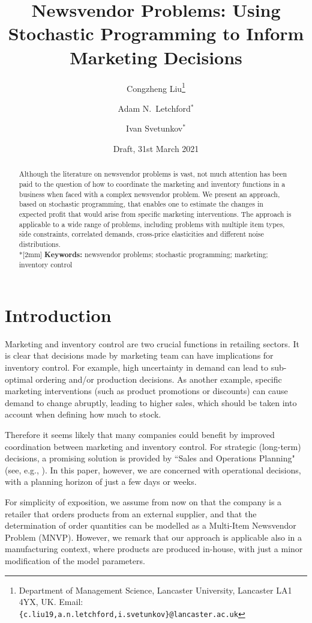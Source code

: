 \documentclass[a4paper,11pt]{article}
\title{Newsvendor Problems: Using Stochastic Programming to Inform Marketing Decisions}
\author{Congzheng Liu\thanks{Department of Management Science,
Lancaster University, Lancaster LA1 4YX, UK.
Email: {\tt \{c.liu19,a.n.letchford,i.svetunkov\}@lancaster.ac.uk}}
\and Adam N.\ Letchford$^*$ \and Ivan Svetunkov$^*$} %
\date{Draft, 31st March 2021}
\begin{document}
\maketitle

\begin{abstract}
Although the literature on newsvendor problems is vast, not much attention has been paid to the question of how to coordinate the marketing and inventory functions in a business when faced with a complex newsvendor problem. We present an approach, based on stochastic programming, that enables one to estimate the changes in expected profit that would arise from specific marketing interventions. The approach is applicable to a wide range of problems, including problems with multiple item types, side constraints, correlated demands, cross-price elasticities and different noise distributions.
\\*[2mm]
{\bf Keywords:} newsvendor problems; stochastic programming; marketing; inventory control 
\end{abstract}

\section{Introduction}

Marketing and inventory control are two crucial functions in retailing sectors. It is clear that decisions made by marketing team can have implications for inventory control. For example, high uncertainty in demand can lead to sub-optimal ordering and/or production decisions. As another example, specific marketing interventions (such as product promotions or discounts) can cause demand to change abruptly, leading to higher sales, which should be taken into account when defining how much to stock.

Therefore it seems likely that many companies could benefit by improved coordination between marketing and inventory control. For strategic (long-term) decisions, a promising solution is provided by ``Sales and Operations Planning" (see, e.g., \cite{KS14,Th12}). In this paper, however, we are concerned with operational decisions, with a planning horizon of just a few days or weeks.

For simplicity of exposition, we assume from now on that the company is a retailer that orders products from an external supplier, and that the determination of order quantities can be modelled as a Multi-Item Newsvendor Problem (MNVP). However, we remark that our approach is applicable also in a manufacturing context, where products are produced in-house, with just a minor modification of the model parameters.
\end{document}
